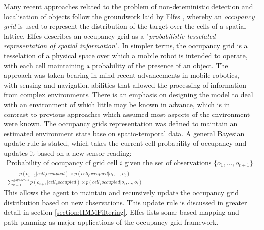 Many recent approaches related to the problem of non-deteministic detection and localisation of objects follow the groundwork laid by Elfes \cite{Elfes1989UsingNavigation}, whereby an \textit{occupancy grid} is used to represent the distribution of the target over the cells of a spatial lattice. Elfes describes an occupancy grid as a "\textit{probabilistic tesselated representation of spatial information}". In simpler terms, the occupancy grid is a tesselation of a physical space over which a mobile robot is intended to operate, with each cell maintaining a probability of the presence of an object. %
The approach was taken bearing in mind recent advancements in mobile robotics, with sensing and navigation abilities that allowed the processing of information from complex environments. There is an emphasis on designing the model to deal with an environment of which little may be known in advance, which is in contrast to previous approaches which assumed most aspects of the environment were known. The occupancy grids representation was defined to maintain an estimated environment state base on spatio-temporal data. A general Bayesian update rule is stated, which takes the current cell probability of occupancy and updates it based on a new sensor reading: 
\begin{equation*}\label{eq:OccUpdateRule}
  \begin{aligned}
  \text{Probability of occupancy of grid cell } i \text{ given the set of observations } \{o_1, ..., o_{t+1}\} = \\
\frac{p(o_{t+1} | cell_i occupied) \times p(cell_i occupied | o_1, ..., o_t)}{\sum_{k=1}^{\# grid cells} p(o_{t+1} | cell_k occupied) \times p(cell_k occupied | o_1, ..., o_t)}
\end{aligned}
\end{equation*}
This allows the agent to maintain and recursively update the occupancy grid distribution based on new observations. This update rule is discussed in greater detail in section \ref{section:HMMFiltering}. Elfes lists sonar based mapping and path planning as major applications of the occupancy grid framework.


